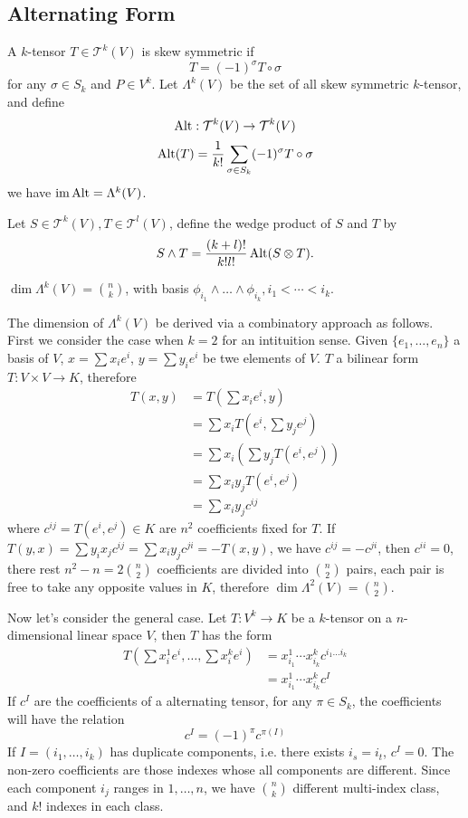 \subsection{Alternating Form}
A $k$-tensor $T \in \mathcal{T}^k(V)$ is skew symmetric if
$$T = (-1)^\sigma T \circ \sigma$$
for any $\sigma \in S_k$ and $P \in V^k$.
Let $\Lambda^k(V)$ be the set of all skew symmetric $k$-tensor,
and define $$\mathop{\mathrm{Alt}} : \mathcal{T}^k(V) \to \mathcal{T}^k(V)$$
$$\mathop{\mathrm{Alt}}(T) = {1 \over k!} \sum_{\sigma \in S_k} (-1)^\sigma T \circ \sigma$$
we have $\mathop{\mathrm{im}} \mathop{\mathrm{Alt}} = \Lambda^k(V)$.

Let $S \in \mathcal{T}^k(V), T \in \mathcal{T}^l(V)$,
define the wedge product of $S$ and $T$ by
$$S \wedge T = {(k + l)! \over k! l!}\mathop{\mathrm{Alt}}(S \otimes T).$$

$\dim \Lambda^k(V) = {n \choose k}$,
with basis $\phi_{i_1} \wedge \dots \wedge \phi_{i_k}, i_1 < \cdots < i_k$.

The dimension of $\Lambda^k(V)$ be derived via a combinatory approach as follows.
First we consider the case when $k=2$ for an intituition sense.
Given $\{e_1, \dots, e_n\}$ a basis of $V$,
$x = \sum x_i e^i$, $y = \sum y_i e^i$ be twe elements of $V$.
$T$ a bilinear form $T : V \times V \to K$,
therefore
\begin{align*}
  T(x, y)
  &= T(\sum x_i e^i, y) \\
  &= \sum x_i T(e^i, \sum y_j e^j) \\
  &= \sum x_i (\sum y_j T(e^i, e^j)) \\
  &= \sum x_i y_j T(e^i, e^j) \\
  &= \sum x_i y_j c^{ij}
\end{align*}
where $c^{ij} = T(e^i, e^j) \in K$ are $n^2$ coefficients fixed for $T$.
If $T(y, x) = \sum y_i x_j c^{ij} = \sum x_i y_j c^{ji} = -T(x, y)$,
we have $c^{ij} = -c^{ji}$, then $c^{ii} = 0$, there rest $n^2 - n = 2{n \choose 2}$
coefficients are divided into $n \choose 2$ pairs, each pair is free to take
any opposite values in $K$, therefore $\dim \Lambda^2(V) = {n \choose 2}$.

Now let's consider the general case.
Let $T : V^k \to K$ be a $k$-tensor on a $n$-dimensional linear space $V$,
then $T$ has the form
\begin{align*}
  T(\sum x_i^1 e^i, \dots, \sum x_i^k e^i)
  &= x_{i_1}^1 \cdots x_{i_k}^k c^{i_1 \dots i_k} \\
  &= x_{i_1}^1 \cdots x_{i_k}^k c^I
\end{align*}
If $c^I$ are the coefficients of a alternating tensor,
for any $\pi \in S_k$, the coefficients will have the relation
$$c^I = (-1)^\pi c^{\pi(I)}$$
If $I = (i_1, \dots, i_k)$ has duplicate components, i.e. there exists
$i_s = i_t$, $c^I = 0$. The non-zero coefficients are those indexes whose
all components are different. Since each component $i_j$ ranges in $1, \dots, n$,
we have ${n \choose k}$ different multi-index class, and $k!$ indexes in each class.


